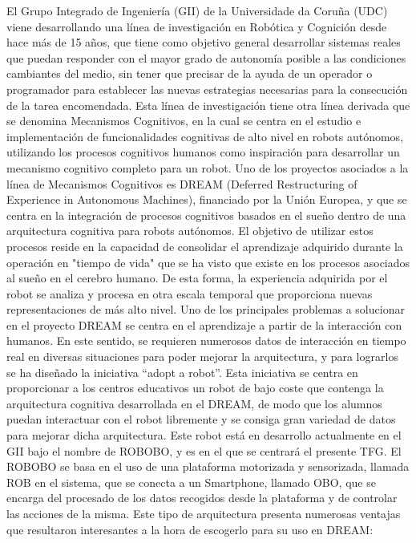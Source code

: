 El Grupo Integrado de Ingeniería (GII) de la Universidade da Coruña (UDC) viene desarrollando una línea de investigación en Robótica y Cognición desde hace más de 15 años, que tiene como objetivo general desarrollar sistemas reales que puedan responder con el mayor grado de autonomía posible a las condiciones cambiantes del medio, sin tener que precisar de la ayuda de un operador o programador para establecer las nuevas estrategias necesarias para la consecución de la tarea encomendada. Esta línea de investigación tiene otra línea derivada que se denomina Mecanismos Cognitivos, en la cual se centra en el estudio e implementación de funcionalidades cognitivas de alto nivel en robots autónomos, utilizando los procesos cognitivos humanos como inspiración para desarrollar un mecanismo cognitivo completo para un robot. 
Uno de los proyectos asociados a la línea de Mecanismos Cognitivos es DREAM\cite{dream_project} (Deferred Restructuring of Experience in Autonomous Machines), financiado por la Unión Europea, y que se centra en la integración de procesos cognitivos basados en el sueño dentro de una arquitectura cognitiva para robots autónomos. El objetivo de utilizar estos procesos reside en la capacidad de consolidar el aprendizaje adquirido durante la operación en "tiempo de vida" que se ha visto que existe en los procesos asociados al sueño en el cerebro humano. De esta forma, la experiencia adquirida por el robot se analiza y procesa en otra escala temporal que proporciona nuevas representaciones de más alto nivel. 
Uno de los principales problemas a solucionar en el proyecto DREAM se centra en el aprendizaje a partir de la interacción con humanos. En este sentido, se requieren numerosos datos de interacción en tiempo real en diversas situaciones para poder mejorar la arquitectura, y para lograrlos se ha diseñado la iniciativa \enquote{adopt a robot}. Esta iniciativa se centra en proporcionar a los centros educativos un robot de bajo coste que contenga la arquitectura cognitiva desarrollada en el DREAM, de modo que los alumnos puedan interactuar con el robot libremente y se consiga gran variedad de datos para mejorar dicha arquitectura. Este robot está en desarrollo actualmente en el GII bajo el nombre de ROBOBO, y es en el que se centrará el presente TFG.
 El ROBOBO se basa en el uso de una plataforma motorizada y sensorizada, llamada ROB en el sistema, que se conecta a un Smartphone, llamado OBO, que se encarga del procesado de los datos recogidos desde la plataforma y de controlar las acciones de la misma. Este tipo de arquitectura presenta numerosas ventajas que resultaron interesantes a la hora de escogerlo para su uso en DREAM:
